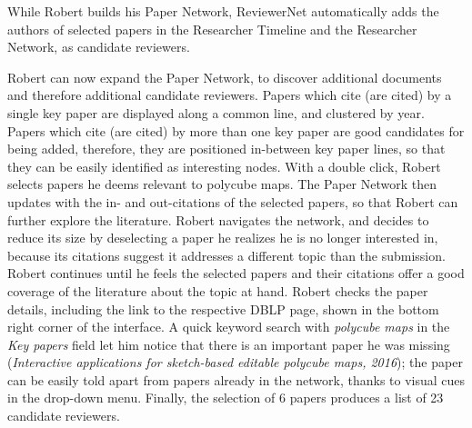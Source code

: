 While Robert builds his Paper Network, ReviewerNet automatically adds the authors of selected papers in the Researcher Timeline and the Researcher Network, as candidate reviewers.

Robert can now expand the Paper Network, to discover additional documents and therefore additional candidate reviewers. Papers which cite (are cited) by a single key paper are displayed along a common line, and clustered by year. Papers which cite (are cited) by more than one key paper are good candidates for being added, therefore, they are positioned in-between key paper lines, so that they can be easily identified as interesting nodes. With a double click, Robert selects  papers he deems relevant to polycube maps. The Paper Network then updates with the in- and out-citations of the selected papers, so that Robert can further explore the literature. Robert navigates the network, and decides to reduce its size by deselecting a paper he realizes he is no longer interested in, because its citations suggest it addresses a different topic than the submission. %
Robert continues until he feels the selected papers and their citations offer a good coverage of the literature about the topic at hand. Robert checks the paper details, including the link to the respective DBLP page, shown in the bottom right corner of the interface. A quick keyword search with \emph{polycube maps} in the \emph{Key papers} field let him notice that there is an important paper he was missing (\emph{Interactive applications for sketch-based editable polycube maps, 2016}); the paper can be easily told apart from papers already in the network, thanks to visual cues in the drop-down menu. Finally, the selection of 6 papers produces a list of 23 candidate reviewers. 


